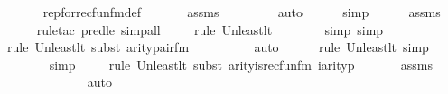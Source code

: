 \begin{isabellebody}
\ \ \ \ \isamarkupfalse%
\ rep{\isacharunderscore}{\kern0pt}for{\isacharunderscore}{\kern0pt}recfun{\isacharunderscore}{\kern0pt}fm{\isacharunderscore}{\kern0pt}def\ \isanewline
\ \ \ \ \isamarkupfalse%
\ assms\ \isanewline
\ \ \ \ \ \ \isamarkupfalse%
\ auto{\isacharbrackleft}{\kern0pt}{}{\isacharbrackright}{\kern0pt}\isanewline
\ \ \ \ \isamarkupfalse%
\ simp\isanewline
\ \ \ \ \isamarkupfalse%
\ assms\isanewline
\ \ \ \ \isamarkupfalse%
{\isacharparenleft}{\kern0pt}rule{\isacharunderscore}{\kern0pt}tac\ pred{\isacharunderscore}{\kern0pt}le{\isacharcomma}{\kern0pt}\ simp{\isacharunderscore}{\kern0pt}all{\isacharparenright}{\kern0pt}{\isacharplus}{\kern0pt}\isanewline
\ \ \ \ \isamarkupfalse%
{\isacharparenleft}{\kern0pt}rule\ Un{\isacharunderscore}{\kern0pt}least{\isacharunderscore}{\kern0pt}lt{\isacharparenright}{\kern0pt}{\isacharplus}{\kern0pt}\isanewline
\ \ \ \ \ \ \isamarkupfalse%
\ {\isacharparenleft}{\kern0pt}simp{\isacharcomma}{\kern0pt}\ simp{\isacharparenright}{\kern0pt}\isanewline
\ \ \ \ \isamarkupfalse%
{\isacharparenleft}{\kern0pt}rule\ Un{\isacharunderscore}{\kern0pt}least{\isacharunderscore}{\kern0pt}lt{\isacharcomma}{\kern0pt}\ subst\ arity{\isacharunderscore}{\kern0pt}pair{\isacharunderscore}{\kern0pt}fm{\isacharparenright}{\kern0pt}\isanewline
\ \ \ \ \ \ \ \ \isamarkupfalse%
\ auto{\isacharbrackleft}{\kern0pt}{}{\isacharbrackright}{\kern0pt}\isanewline
\ \ \ \ \ \isamarkupfalse%
{\isacharparenleft}{\kern0pt}rule\ Un{\isacharunderscore}{\kern0pt}least{\isacharunderscore}{\kern0pt}lt{\isacharcomma}{\kern0pt}\ simp{\isacharparenright}{\kern0pt}{\isacharplus}{\kern0pt}\isanewline
\ \ \ \ \ \isamarkupfalse%
\ simp\isanewline
\ \ \ \ \isamarkupfalse%
{\isacharparenleft}{\kern0pt}rule\ Un{\isacharunderscore}{\kern0pt}least{\isacharunderscore}{\kern0pt}lt{\isacharcomma}{\kern0pt}\ subst\ arity{\isacharunderscore}{\kern0pt}is{\isacharunderscore}{\kern0pt}recfun{\isacharunderscore}{\kern0pt}fm{\isacharbrackleft}{\kern0pt}\ i{\isacharequal}{\kern0pt}{\isachardoublequoteopen}arity{\isacharparenleft}{\kern0pt}p{\isacharparenright}{\kern0pt}{\isachardoublequoteclose}{\isacharbrackright}{\kern0pt}{\isacharparenright}{\kern0pt}\ \isanewline
\ \ \ \ \isamarkupfalse%
\ assms\isanewline
\ \ \ \ \ \ \ \ \ \ \ \isamarkupfalse%
\ auto{\isacharbrackleft}{\kern0pt}{}{\isacharbrackright}{\kern0pt}\isanewline

\end{isabellebody}
